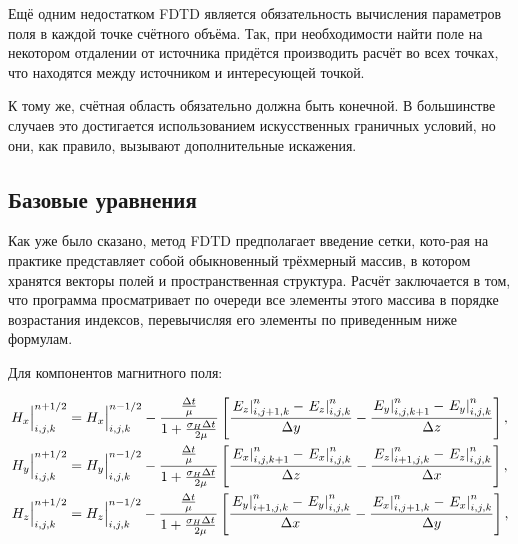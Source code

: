 Ещё одним недостатком FDTD является обязательность вычисления параметров поля в каждой точке счётного объёма. Так, при необходимости найти поле на некотором отдалении от источника придётся производить расчёт во всех точках, что находятся между источником и интересующей точкой.

К тому же, счётная область обязательно должна быть конечной. В большинстве случаев это достигается использованием искусственных граничных условий, но они, как правило, вызывают дополнительные искажения.

\subsection{Базовые уравнения}

Как уже было сказано, метод FDTD предполагает введение сетки, кото-рая на практике представляет собой обыкновенный трёхмерный массив, в котором хранятся векторы полей и пространственная структура. Расчёт заключается в том, что программа просматривает по очереди все элементы этого массива в порядке возрастания индексов, перевычисляя его элементы по приведенным ниже формулам.

Для компонентов магнитного поля:

\label{eq:BaseFdtdEquations}
\begin{align*}
	H_x\Big|^{n+1/2}_{i,j,k} &=
        H_x\Big|^{n-1/2}_{i,j,k} - \frac{\frac{\Delta{t}}{\mu}}
             {1+\frac{\sigma_H\Delta{t}}{2\mu}}
        \left[
            \frac{\left.E_z\right|^{n}_{i,j+1,k} - \left.E_z\right|^{n}_{i,j,k}}{\Delta{y}} -
            \frac{\left.E_y\right|^{n}_{i,j,k+1} - \left.E_y\right|^{n}_{i,j,k}}{\Delta{z}}
        \right], \\
	H_y\Big|^{n+1/2}_{i,j,k} &=
        H_y\Big|^{n-1/2}_{i,j,k} - \frac{\frac{\Delta{t}}{\mu}}
             {1+\frac{\sigma_H\Delta{t}}{2\mu}}
        \left[
            \frac{\left.E_x\right|^{n}_{i,j,k+1} - \left.E_x\right|^{n}_{i,j,k}}{\Delta{z}} -
            \frac{\left.E_z\right|^{n}_{i+1,j,k} - \left.E_z\right|^{n}_{i,j,k}}{\Delta{x}}
        \right], \\
	H_z\Big|^{n+1/2}_{i,j,k} &=
        H_z\Big|^{n-1/2}_{i,j,k} - \frac{\frac{\Delta{t}}{\mu}}
             {1+\frac{\sigma_H\Delta{t}}{2\mu}}
        \left[
            \frac{\left.E_y\right|^{n}_{i+1,j,k} - \left.E_y\right|^{n}_{i,j,k}}{\Delta{x}} -
            \frac{\left.E_x\right|^{n}_{i,j+1,k} - \left.E_x\right|^{n}_{i,j,k}}{\Delta{y}}
        \right],
\end{align*}

